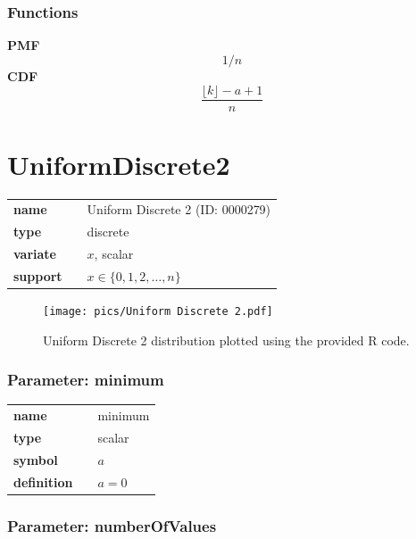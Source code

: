 \documentclass{article}
\begin{document}
\subsubsection*{Functions}

\smallskip \noindent \hspace{.2cm} \textbf{PMF} 
\begin{equation*}1/n\end{equation*}
\smallskip \noindent \hspace{.2cm} \textbf{CDF} 
\begin{equation*}\frac{\lfloor k \rfloor -a+1}{n}\end{equation*}
\smallskip\section*{UniformDiscrete2} 

  \bigskip 

\begin{tabular}{p{2cm}cl}
\textbf{name} & & Uniform Discrete 2 (ID: 0000279)\\ 
 
\textbf{type} & & discrete \\ 

\textbf{variate} & & $x$, scalar \\ 

\textbf{support} & & $x \in \{0,1,2,\dots,n\}$
\end{tabular}

\begin{figure}[ht!]
\centering
  \texttt{[image: pics/Uniform Discrete 2.pdf]}
 \caption{Uniform Discrete 2 distribution plotted using the provided R code.}
 \label{fig:Uniform Discrete 2}
\end{figure}

\subsubsection*{Parameter: minimum}

\noindent\begin{tabular}{p{2cm}cl}
\textbf{name} & & minimum \\
\textbf{type} & & scalar \\
\textbf{symbol} & & $a$  \\
\textbf{definition} & & $a=0$
\end{tabular}
\subsubsection*{Parameter: numberOfValues}
\end{document}
